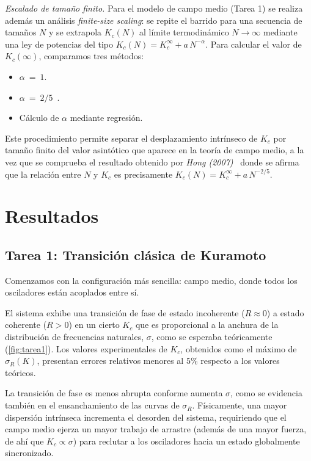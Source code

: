 \documentclass[
  reprint,
  amsmath,amssymb,
  aps,
  pra,
]{revtex4-2}
\begin{document}
\textit{Escalado de tamaño finito.}\;
Para el modelo de campo medio (Tarea 1) se realiza además un análisis \textit{finite-size scaling}: se repite el barrido para una secuencia de tamaños \(N\) y se extrapola \(K_c(N)\) al límite termodinámico \(N\to\infty\) mediante una ley de potencias del tipo \(K_c(N) = K_c^\infty + a\,N^{-\alpha}\). Para calcular el valor de \(K_c(\infty)\), comparamos tres métodos:

\begin{itemize}
    \item \(\alpha \ = \ 1\).
    \item \(\alpha \ = \ 2/5 \)~\cite{hong2007finite}.
    \item Cálculo de \(\alpha\) mediante regresión.
\end{itemize}

Este procedimiento permite separar el desplazamiento intrínseco de \(K_c\) por tamaño finito del valor asintótico que aparece en la teoría de campo medio, a la vez que se comprueba el resultado obtenido por \textit{Hong (2007)}~\cite{hong2007finite} donde se afirma que la relación entre \(N\) y \(K_c\) es precisamente \(K_c(N) = K_c^\infty + a\,N^{-2/5}\).

\section{Resultados}
\label{sec:resultados}

\subsection{Tarea 1: Transición clásica de Kuramoto}
\label{sec:tarea1}

Comenzamos con la configuración más sencilla: campo medio, donde todos los osciladores están acoplados entre sí.

El sistema exhibe una transición de fase de estado incoherente ($R\approx 0$) a estado coherente ($R>0$) en un cierto $K_c$ que es proporcional a la anchura de la distribución de frecuencias naturales, $\sigma$, como se esperaba teóricamente (\cref{fig:tarea1}). Los valores experimentales de $K_c$, obtenidos como el máximo de $\sigma_R(K)$, presentan errores relativos menores al $5\%$ respecto a los valores teóricos.

La transición de fase es menos abrupta conforme aumenta $\sigma$, como se evidencia también en el ensanchamiento de las curvas de $\sigma_R$. Físicamente, una mayor dispersión intrínseca incrementa el desorden del sistema, requiriendo que el campo medio ejerza un mayor trabajo de arrastre (además de una mayor fuerza, de ahí que $K_c\propto \sigma$) para reclutar a los osciladores hacia un estado globalmente sincronizado.
\end{document}
